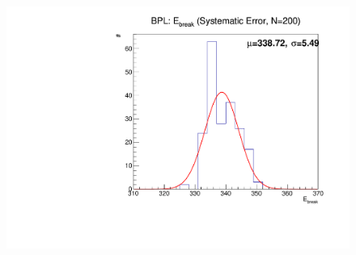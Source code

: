\documentclass{beamer}
\begin{document}
\begin{frame}
\begin{columns}
    \begin{figure}[h!]
      \includegraphics[height=\textwidth]{figure/monte_carlo/N200/BPLwHe_e_break_sys.pdf}
    \end{figure}    
  \end{columns}
\end{frame}
\end{document}
